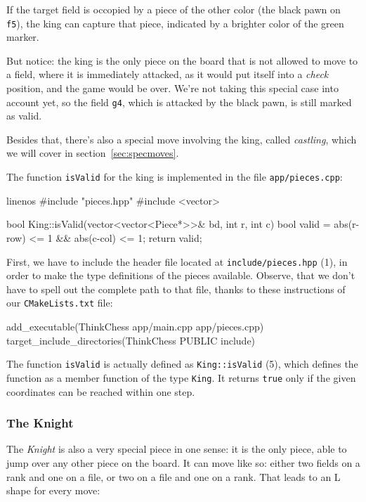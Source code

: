 If the target field is occopied by a piece of the other color (the black pawn on \texttt{f5}),
the king can capture that piece, indicated by a brighter color of the green marker.

But notice: the king is the only piece on the board that is not allowed to move to a field,
where it is immediately attacked, as it would put
itself into a \emph{check} position, and the game would be over.
We're not taking this special case into account yet, so the field \texttt{g4},
which is attacked by the black pawn, is still marked as valid.

Besides that, there's also a special move involving the king, called \emph{castling},
which we will cover in section~\ref{sec:specmoves}.

The function \texttt{isValid} for the king is implemented in the file
\texttt{app/pieces.cpp}:

\begin{cpp*}{linenos}
#include "pieces.hpp"
#include <vector>

bool King::isValid(vector<vector<Piece*>>& bd, int r, int c) {
  bool valid = abs(r-row) <= 1 && abs(c-col) <= 1;
  return valid;
}
\end{cpp*}

First, we have to include the header file located at \texttt{include/pieces.hpp} (1),
in order to make the type definitions of the pieces available.
Observe, that we don't have to spell out the complete path to that file, thanks to these
instructions of our \texttt{CMakeLists.txt} file:

\begin{cpp}
add_executable(ThinkChess app/main.cpp app/pieces.cpp)
target_include_directories(ThinkChess PUBLIC include)
\end{cpp}

The function \texttt{isValid} is actually defined as
\texttt{King::isValid} (5), which defines the function as a member function of the
type \texttt{King}.
It returns \texttt{true} only if the given coordinates can be reached within one step.

\subsubsection{The Knight}
The \emph{Knight} is also a very special piece in one sense: it is the only piece, able to
jump over any other piece on the board.
It can move like so: either two fields on a rank and one on a file, or two on a file and one on
a rank.
That leads to an L shape for every move:


